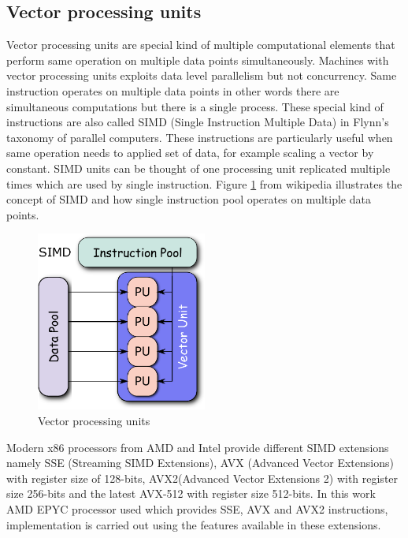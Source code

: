 \subsection{Vector processing units}
Vector processing units are special kind of multiple computational elements that perform same operation on multiple data points simultaneously. Machines with vector processing units exploits data level parallelism but not concurrency. Same instruction operates on multiple data points in other words there are simultaneous computations but there is a single process. These special kind of instructions are also called SIMD (Single Instruction Multiple Data) in Flynn's taxonomy of parallel computers. These instructions are particularly useful when same operation needs to applied set of data, for example scaling a vector by constant. SIMD  units can be thought of one processing unit replicated multiple times which are used by single instruction. Figure \ref{fig:simdUnits} from wikipedia \cite{SIMDWiki} illustrates the concept of SIMD and how single instruction pool operates on multiple data points.

\begin{figure}[h]
	\centering
	\includegraphics[width=0.5\textwidth]{./figures/SIMD2.eps}
	\caption{Vector processing units}
	\label{fig:simdUnits}
\end{figure}

Modern x86 processors from AMD and Intel provide different SIMD extensions namely SSE (Streaming SIMD Extensions), AVX (Advanced Vector Extensions) with register size of 128-bits, AVX2(Advanced Vector Extensions 2) with register size 256-bits and the latest AVX-512 with register size 512-bits. In this work AMD EPYC processor used which provides SSE, AVX and AVX2 instructions, implementation is carried out using the features available in these extensions.

